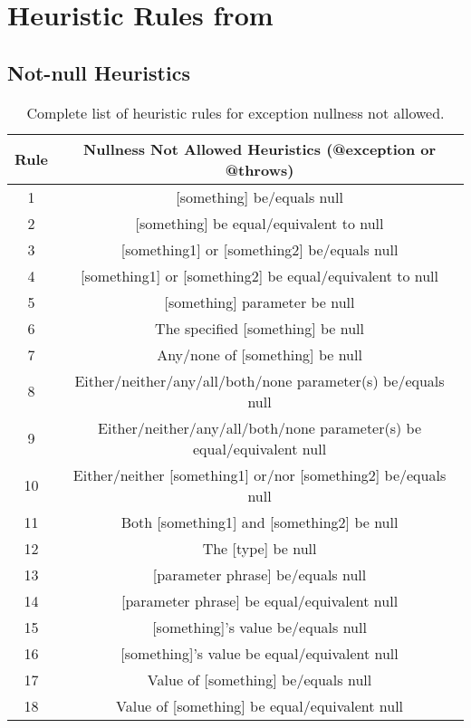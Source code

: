 \section{Heuristic Rules from \cite{zhou-directive}}
\subsection{Not-null Heuristics}
\label{app:not-null}
\begin{table}[]
	\begin{tabular}{|c|c|}
		\hline
		\textbf{Rule} & \textbf{Nullness Not Allowed Heuristics (@exception or @throws)} \\ \hline
		1 & [something] be/equals null \\ \hline
		2 & [something] be equal/equivalent to null \\ \hline
		3 & [something1] or [something2] be/equals null \\ \hline
		4 & [something1] or [something2] be equal/equivalent to null \\ \hline
		5 & [something] parameter be null \\ \hline
		6 & The specified [something] be null \\ \hline
		7 & Any/none of [something] be null \\ \hline
		8 & Either/neither/any/all/both/none parameter(s) be/equals null \\ \hline
		9 & Either/neither/any/all/both/none parameter(s) be equal/equivalent null \\ \hline
		10 & Either/neither [something1] or/nor [something2] be/equals null \\ \hline
		11 & Both [something1] and [something2] be null \\ \hline
		12 & The [type] be null \\ \hline
		13 & [parameter phrase] be/equals null \\ \hline
		14 & [parameter phrase] be equal/equivalent null \\ \hline
		15 & [something]’s value be/equals null \\ \hline
		16 & [something]’s value be equal/equivalent null \\ \hline
		17 & Value of [something] be/equals null \\ \hline
		18 & Value of [something] be equal/equivalent null \\ \hline
	\end{tabular}
	\caption{Complete list of heuristic rules for exception nullness not allowed.}
	\label{tab:complete-not-null-heuristic-except}
\end{table}

